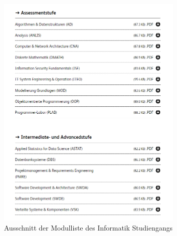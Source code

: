\documentclass[a4paper, table]{article}
\begin{document}
\begin{figure}[hb]
    \centering
    \includegraphics[width=0.8\textwidth]{img/ausschnittModullisteHsluInformatik.PNG}
    \caption{Ausschnitt der Modulliste des Informatik Studiengangs}
    \label{fig:modulliste-informatik}
\end{figure}
\clearpage
\end{document}
